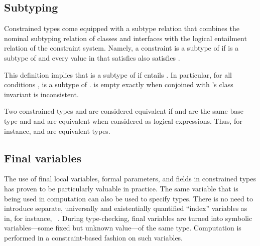 \subsection{Subtyping}
Constrained types come equipped with a subtype relation that
combines the nominal subtyping relation of classes and interfaces with
the logical entailment relation of the constraint system. Namely, a
constraint  is a subtype of  if  is a
subtype of  and every value in  that satisfies 
also satisfies .


This definition 
implies that
 is a subtype of  if 
entails .
In particular, for all conditions ,
 is a subtype of .
 is empty exactly
when  conjoined with 's class invariant is inconsistent.

Two constrained types
 and 
are considered
equivalent if  and  are the same base type and
 and  are equivalent when considered as logical
expressions. Thus, for instance,  and  are
equivalent types.

\subsection{Final variables}

The use of final local variables, formal parameters, and
fields in constrained
types has proven to be particularly valuable in practice. The same
variable that is being used in computation can also be used to specify
types. There is no need to introduce separate, universally and
existentially quantified ``index'' variables as in, for
instance, \DML{}~\cite{xi99dependent}.
%
During type-checking, final variables are turned into symbolic
variables---some fixed but unknown value---of the same type.
Computation is performed in a constraint-based fashion on such
variables.

